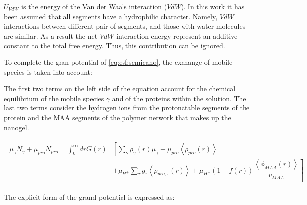$U_{VdW}$ is the energy of the Van der Waals interaction ($VdW$). In this work it has been assumed that all segments have a hydrophilic character. Namely, $VdW$ interactions between different pair of segments, and those with water molecules are similar. As a result the net $VdW$ interaction energy represent an additive constant to the total free energy.
Thus, this contribution can be ignored.


To complete the gran potential of \ref{eq:esf:semicano}, the exchange of mobile species is taken into account:

The first two terms on the left side of the equation account for the chemical equilibrium of the mobile species $\gamma$ and of the proteins within the solution.
The last two terms consider the hydrogen ions from the protonatable segments of the protein and the MAA segments of the polymer network that makes up the nanogel.


\begin{align}
	\begin{aligned}
		\mu_\gamma N_\gamma + \mu_{pro} N_{pro} =\int_0^\infty drG(r)&\left[\sum_{\gamma }{\rho_\gamma(r)\mu_\gamma}
		+ \mu_{pro} \left<\rho_{pro}(r)\right> \right. \\
		& \left. +\mu_{H^+}\sum_{\tau}{g_\tau\left<\rho_{pro,\tau}(r)\right> } +\mu_{H^+}(1-f(r))\dfrac{\left<\phi_{MAA}(r)\right>}{v_{MAA}}\right]
	\end{aligned}
\end{align}


The explicit form of the grand potential is expressed as:

